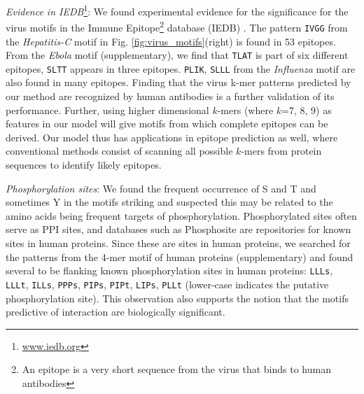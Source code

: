 \documentclass{bioinfo}
\begin{document}



\noindent\emph{Evidence in IEDB}\footnote{\url{www.iedb.org}}:
We found experimental evidence for the significance for the virus motifs in the Immune Epitope\footnote{An epitope is a very short sequence from the virus that binds to human antibodies} database (IEDB) \citep{iedb}.
The pattern \texttt{IVGG} from the \textit{Hepatitis-C} motif in Fig. \ref{fig:virus_motifs}(right) is found in 53 epitopes.
From the \textit{Ebola} motif (supplementary), we find that \texttt{TLAT} is part of six different epitopes, \texttt{SLTT} appears in three epitopes. \texttt{PLIK}, \texttt{SLLL} from the \textit{Influenza} motif are also found in many epitopes. Finding that the virus k-mer patterns predicted by our method are recognized by human antibodies
is a further validation of its performance.
Further, using higher dimensional $k$-mers (where $k$=7, 8, 9) as
features in our model will give motifs from which complete epitopes can be derived. %
Our model thus has applications in epitope prediction as well, where conventional methods consist of scanning all possible $k$-mers from protein sequences to identify likely epitopes.


\noindent\emph{Phosphorylation sites}: 
We found the frequent occurrence of S and T and sometimes Y in the motifs striking and suspected this may be
related to the amino acids being frequent targets of phosphorylation.
Phosphorylated sites often serve as PPI sites, and databases such as Phosphosite \citep{phosphosite} are
 repositories for known sites in human proteins. Since these are sites in human proteins, we searched for the patterns from the 4-mer motif of human proteins (supplementary) and found several to be flanking known phosphorylation sites in human proteins:
\texttt{LLLs}, \texttt{LLLt}, \texttt{ILLs}, \texttt{PPPs}, \texttt{PIPs}, \texttt{PIPt}, \texttt{LIPs}, \texttt{PLLt} (lower-case indicates the putative phosphorylation site). This observation also supports the notion that the motifs predictive
of interaction are biologically significant.

\end{document}
